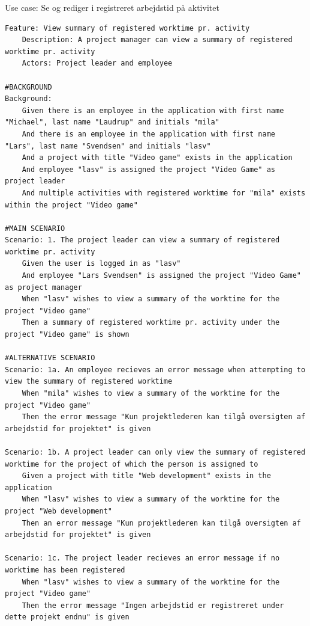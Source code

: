 \begin{listing}[H]
    \centering
    \caption{Use case: Se og rediger i registreret arbejdstid på aktivitet}\label{lst:usecase_oversigt_over_registreret_arbejdstid_pr_aktivitet}
    \begin{verbatim}  
Feature: View summary of registered worktime pr. activity
    Description: A project manager can view a summary of registered worktime pr. activity
    Actors: Project leader and employee

#BACKGROUND
Background: 
    Given there is an employee in the application with first name "Michael", last name "Laudrup" and initials "mila"
    And there is an employee in the application with first name "Lars", last name "Svendsen" and initials "lasv"
    And a project with title "Video game" exists in the application
    And employee "lasv" is assigned the project "Video Game" as project leader
    And multiple activities with registered worktime for "mila" exists within the project "Video game"

#MAIN SCENARIO
Scenario: 1. The project leader can view a summary of registered worktime pr. activity
    Given the user is logged in as "lasv"
    And employee "Lars Svendsen" is assigned the project "Video Game" as project manager
    When "lasv" wishes to view a summary of the worktime for the project "Video game"
    Then a summary of registered worktime pr. activity under the project "Video game" is shown

#ALTERNATIVE SCENARIO
Scenario: 1a. An employee recieves an error message when attempting to view the summary of registered worktime
    When "mila" wishes to view a summary of the worktime for the project "Video game"
    Then the error message "Kun projektlederen kan tilgå oversigten af arbejdstid for projektet" is given

Scenario: 1b. A project leader can only view the summary of registered worktime for the project of which the person is assigned to
    Given a project with title "Web development" exists in the application
    When "lasv" wishes to view a summary of the worktime for the project "Web development"
    Then an error message "Kun projektlederen kan tilgå oversigten af arbejdstid for projektet" is given

Scenario: 1c. The project leader recieves an error message if no worktime has been registered
    When "lasv" wishes to view a summary of the worktime for the project "Video game"
    Then the error message "Ingen arbejdstid er registreret under dette projekt endnu" is given
    \end{verbatim}
\end{listing}\newpage
